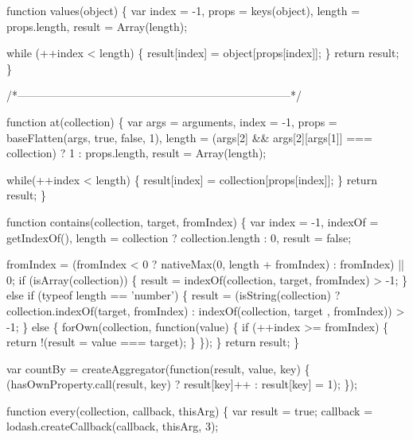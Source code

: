 \begin{DoxyCodeInclude}
    \textcolor{keyword}{function} values(\textcolor{keywordtype}{object}) \{
      var index = -1,
          props = keys(\textcolor{keywordtype}{object}),
          length = props.length,
          result = Array(length);

      \textcolor{keywordflow}{while} (++index < length) \{
        result[index] = \textcolor{keywordtype}{object}[props[index]];
      \}
      \textcolor{keywordflow}{return} result;
    \}

    \textcolor{comment}{/*--------------------------------------------------------------------------*/}

    \textcolor{keyword}{function} at(collection) \{
      var args = arguments,
          index = -1,
          props = baseFlatten(args, \textcolor{keyword}{true}, \textcolor{keyword}{false}, 1),
          length = (args[2] && args[2][args[1]] === collection) ? 1 : props.length,
          result = Array(length);

      \textcolor{keywordflow}{while}(++index < length) \{
        result[index] = collection[props[index]];
      \}
      \textcolor{keywordflow}{return} result;
    \}

    \textcolor{keyword}{function} contains(collection, target, fromIndex) \{
      var index = -1,
          indexOf = getIndexOf(),
          length = collection ? collection.length : 0,
          result = \textcolor{keyword}{false};

      fromIndex = (fromIndex < 0 ? nativeMax(0, length + fromIndex) : fromIndex) || 0;
      \textcolor{keywordflow}{if} (isArray(collection)) \{
        result = indexOf(collection, target, fromIndex) > -1;
      \} \textcolor{keywordflow}{else} \textcolor{keywordflow}{if} (typeof length == \textcolor{stringliteral}{'number'}) \{
        result = (isString(collection) ? collection.indexOf(target, fromIndex) : indexOf(collection, target
      , fromIndex)) > -1;
      \} \textcolor{keywordflow}{else} \{
        forOwn(collection, \textcolor{keyword}{function}(value) \{
          \textcolor{keywordflow}{if} (++index >= fromIndex) \{
            \textcolor{keywordflow}{return} !(result = value === target);
          \}
        \});
      \}
      \textcolor{keywordflow}{return} result;
    \}

    var countBy = createAggregator(\textcolor{keyword}{function}(result, value, key) \{
      (hasOwnProperty.call(result, key) ? result[key]++ : result[key] = 1);
    \});

    \textcolor{keyword}{function} every(collection, callback, thisArg) \{
      var result = \textcolor{keyword}{true};
      callback = lodash.createCallback(callback, thisArg, 3);


\end{DoxyCodeInclude}
